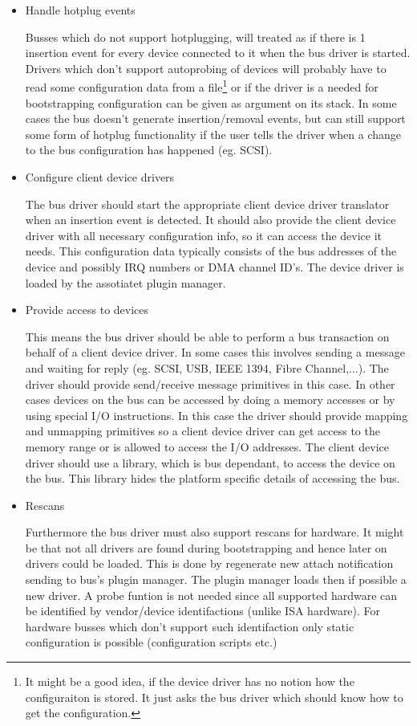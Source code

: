 \begin{itemize}
\item Handle hotplug events

  Busses which do not support hotplugging, will treated as if there is
  1 insertion event for every device connected to it when the bus
  driver is started.  Drivers which don't support autoprobing of
  devices will probably have to read some configuration data from a
  file\footnote{It might be a good idea, if the device driver has no
  notion how the configuraiton is stored.  It just asks the bus driver
  which should know how to get the configuration.} or if the driver is
  a needed for bootstrapping configuration can be given as argument on
  its stack.  In some cases the bus doesn't generate insertion/removal
  events, but can still support some form of hotplug functionality if
  the user tells the driver when a change to the bus configuration has
  happened (eg. SCSI).
\item Configure client device drivers

  The bus driver should start the appropriate client device driver
  translator when an insertion event is detected.  It should also
  provide the client device driver with all necessary configuration
  info, so it can access the device it needs.  This configuration data
  typically consists of the bus addresses of the device and possibly
  IRQ numbers or DMA channel ID's.  The device driver is loaded by the
  assotiatet plugin manager.
\item Provide access to devices

  This means the bus driver should be able to perform a bus
  transaction on behalf of a client device driver.  In some cases this
  involves sending a message and waiting for reply (eg. SCSI, USB,
  IEEE 1394, Fibre Channel,...).  The driver should provide
  send/receive message primitives in this case.  In other cases
  devices on the bus can be accessed by doing a memory accesses or by
  using special I/O instructions.  In this case the driver should
  provide mapping and unmapping primitives so a client device driver
  can get access to the memory range or is allowed to access the I/O
  addresses.  The client device driver should use a library, which is
  bus dependant, to access the device on the bus.  This library hides
  the platform specific details of accessing the bus.  
\item Rescans

  Furthermore the bus driver must also support rescans for hardware.
  It might be that not all drivers are found during bootstrapping and
  hence later on drivers could be loaded.  This is done by regenerate
  new attach notification sending to bus's plugin manager.  The plugin
  manager loads then if possible a new driver.  A probe funtion is not
  needed since all supported hardware can be identified by
  vendor/device identifactions (unlike ISA hardware).  For hardware
  busses which don't support such identifaction only static
  configuration is possible (configuration scripts etc.)
\end{itemize}

